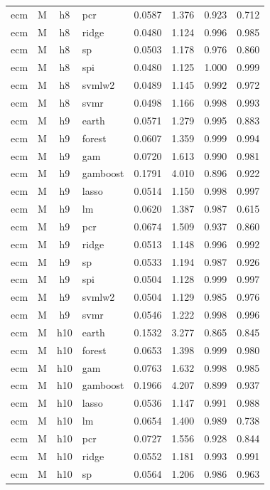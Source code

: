 \begin{ThreePartTable}
\begin{longtable}[t]{llclcccc}
ecm & M & h8 & pcr & 0.0587 & 1.376 & 0.923 & 0.712\\
ecm & M & h8 & ridge & 0.0480 & 1.124 & 0.996 & 0.985\\
ecm & M & h8 & sp & 0.0503 & 1.178 & 0.976 & 0.860\\
ecm & M & h8 & spi & 0.0480 & 1.125 & 1.000 & 0.999\\
ecm & M & h8 & svmlw2 & 0.0489 & 1.145 & 0.992 & 0.972\\
ecm & M & h8 & svmr & 0.0498 & 1.166 & 0.998 & 0.993\\
\addlinespace
ecm & M & h9 & earth & 0.0571 & 1.279 & 0.995 & 0.883\\
ecm & M & h9 & forest & 0.0607 & 1.359 & 0.999 & 0.994\\
ecm & M & h9 & gam & 0.0720 & 1.613 & 0.990 & 0.981\\
ecm & M & h9 & gamboost & 0.1791 & 4.010 & 0.896 & 0.922\\
ecm & M & h9 & lasso & 0.0514 & 1.150 & 0.998 & 0.997\\
ecm & M & h9 & lm & 0.0620 & 1.387 & 0.987 & 0.615\\
ecm & M & h9 & pcr & 0.0674 & 1.509 & 0.937 & 0.860\\
ecm & M & h9 & ridge & 0.0513 & 1.148 & 0.996 & 0.992\\
ecm & M & h9 & sp & 0.0533 & 1.194 & 0.987 & 0.926\\
ecm & M & h9 & spi & 0.0504 & 1.128 & 0.999 & 0.997\\
ecm & M & h9 & svmlw2 & 0.0504 & 1.129 & 0.985 & 0.976\\
ecm & M & h9 & svmr & 0.0546 & 1.222 & 0.998 & 0.996\\
\addlinespace
ecm & M & h10 & earth & 0.1532 & 3.277 & 0.865 & 0.845\\
ecm & M & h10 & forest & 0.0653 & 1.398 & 0.999 & 0.980\\
ecm & M & h10 & gam & 0.0763 & 1.632 & 0.998 & 0.985\\
ecm & M & h10 & gamboost & 0.1966 & 4.207 & 0.899 & 0.937\\
ecm & M & h10 & lasso & 0.0536 & 1.147 & 0.991 & 0.988\\
ecm & M & h10 & lm & 0.0654 & 1.400 & 0.989 & 0.738\\
ecm & M & h10 & pcr & 0.0727 & 1.556 & 0.928 & 0.844\\
ecm & M & h10 & ridge & 0.0552 & 1.181 & 0.993 & 0.991\\
ecm & M & h10 & sp & 0.0564 & 1.206 & 0.986 & 0.963\\

\end{longtable}
\end{ThreePartTable}

